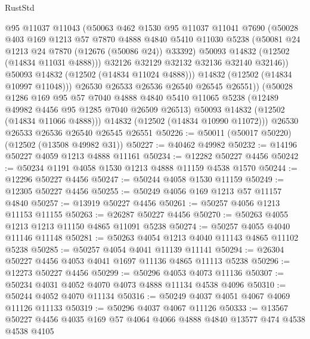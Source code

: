 \begin{lexlean}{RustStd}
\begin{coremodule}
                @95
                @11037
                @11043
                (@50063
                  @462
                  @1530
                  @95
                  @11037
                  @11041
                  @7690
                  (@50028
                    @403
                    @169
                    @1213
                    @57
                    @7870
                    @4888
                    @4840
                    @5410
                    @11030
                    @5238
                    (@50081 @24 @1213 @24 @7870 (@12676 (@50086 @24)) @33392)
                    @50093
                    @14832
                    (@12502 (@14834 @11031 @4888)))
                  @32126
                  @32129
                  @32132
                  @32136
                  @32140
                  @32146))
              @50093
              @14832
              (@12502 (@14834 @11024 @4888)))
            @14832
            (@12502 (@14834 @10997 @11048)))
          @26530
          @26533
          @26536
          @26540
          @26545
          @26551))
      (@50028
        @1286
        @169
        @95
        @57
        @7040
        @4888
        @4840
        @5410
        @11065
        @5238
        (@12489 @49982 @4456 @95 @1285 @7040 @26509 @26513)
        @50093
        @14832
        (@12502 (@14834 @11066 @4888)))
      @14832
      (@12502 (@14834 @10990 @11072)))
    @26530
    @26533
    @26536
    @26540
    @26545
    @26551
@50226 := @50011 (@50017 @50220) (@12502 (@13508 @49982 @31))
@50227 := @40462 @49982
@50232 := @14196 @50227 @4059 @1213 @4888 @11161
@50234 := @12282 @50227 @4456
@50242 := @50234 @1191 @4058 @1530 @1213 @4888 @11159 @4538 @1570
@50244 := @12296 @50227 @4456
@50247 := @50244 @4058 @1530 @11159
@50249 := @12305 @50227 @4456
@50255 := @50249 @4056 @169 @1213 @57 @11157 @4840
@50257 := @13919 @50227 @4456
@50261 := @50257 @4056 @1213 @11153 @11155
@50263 := @26287 @50227 @4456
@50270 := @50263 @4055 @1213 @1213 @11150 @4865 @11091 @5238
@50274 := @50257 @4055 @4040 @11146 @11148
@50281 := @50263 @4054 @1213 @4040 @11143 @4865 @11102 @5238
@50285 := @50257 @4054 @4041 @11139 @11141
@50294 := @26304 @50227 @4456 @4053 @4041 @1697 @11136 @4865 @11113 @5238
@50296 := @12273 @50227 @4456
@50299 := @50296 @4053 @4073 @11136
@50307 := @50234 @4031 @4052 @4070 @4073 @4888 @11134 @4538 @4096
@50310 := @50244 @4052 @4070 @11134
@50316 := @50249 @4037 @4051 @4067 @4069 @11126 @11133
@50319 := @50296 @4037 @4067 @11126
@50333 := @13567 @50227 @4456 @4035 @169 @57 @4064 @4066 @4888 @4840 @13577 @474 @4538 @4538 @4105

\end{coremodule}
\end{lexlean}
